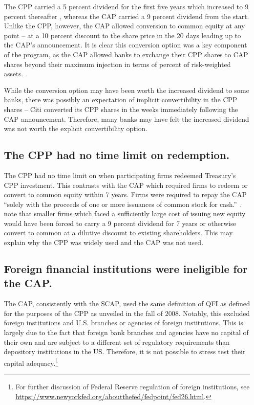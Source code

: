 \documentclass[12pt]{article}
\begin{document}
The CPP carried a 5 percent dividend for the first five years which increased to 9 percent thereafter , whereas the CAP carried a 9 percent dividend from the start. Unlike the CPP, however, the CAP allowed conversion to common equity at any point -- at a 10 percent discount to the share price in the 20 days leading up to the CAP's announcement. It is clear this conversion option was a key component of the program, as the CAP allowed banks to exchange their CPP shares to CAP shares beyond their maximum injection in terms of percent of risk-weighted assets. \citep{GW}.

While the conversion option may have been worth the increased dividend to some banks, there was possibly an expectation of implicit convertibility in the CPP shares -- Citi converted its CPP shares in the weeks immediately following the CAP announcement. Therefore, many banks may have felt the increased dividend was not worth the explicit convertibility option.

\subsection{The CPP had no time limit on redemption.}

The CPP had no time limit on when participating firms redeemed Treasury's CPP investment. This contrasts with the CAP which required firms to redeem or convert to common equity within 7 years. Firms were required to repay the CAP ``solely with the proceeds of one or more issuances of common stock for cash.'' \citep{CAPTerms}. \citet{GW} note that smaller firms which faced a sufficiently large cost of issuing new equity would have been forced to carry a 9 percent dividend for 7 years or otherwise convert to common at a dilutive discount to existing shareholders. This may explain why the CPP was widely used and the CAP was not used. 

\subsection{Foreign financial institutions were ineligible for the CAP.}

The CAP, consistently with the SCAP, used the same definition of QFI as defined for the purposes of the CPP as unveiled in the fall of 2008. Notably, this excluded foreign institutions and U.S. branches or agencies of foreign institutions. This is largely due to the fact that foreign bank branches and agencies have no capital of their own and are subject to a different set of regulatory requirements than depository institutions in the US. Therefore, it is not possible to stress test their capital adequacy.\footnote{For further discussion of Federal Reserve regulation of foreign institutions, see \url{https://www.newyorkfed.org/aboutthefed/fedpoint/fed26.html}.}
\end{document}
